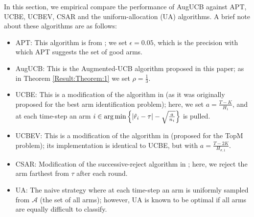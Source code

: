 
In this section, we empirical compare the  performance of AugUCB against APT, UCBE, UCBEV, CSAR and the uniform-allocation (UA) algorithms. A brief note about these algorithms are as follows:
\begin{itemize}
\item APT: This algorithm is from \cite{locatelli2016optimal}; we set $\epsilon=0.05$, which is the precision with which APT suggests the set of good arms.
\item AugUCB: This is the Augmented-UCB algorithm proposed in this paper; as in Theorem \ref{Result:Theorem:1} we set $\rho=\frac{1}{3}$.
\item UCBE: This is a modification of the algorithm in \cite{audibert2009exploration} (as it was originally proposed for the best arm identification problem); here, we set $a=\frac{T-K}{H_1}$, and at each time-step an arm $i\in\operatorname*{arg\,min}\left\lbrace |\hat{r}_{i} -\tau|-\sqrt{\frac{a}{n_{i}}} \right\rbrace$ is pulled.
\item UCBEV: This is a modification of the algorithm in \cite{gabillon2011multi} (proposed for the TopM problem); its implementation is identical to UCBE, but with $a = \frac{T-2K}{H_{\sigma,1}}$.
\item CSAR:  Modification of the successive-reject algorithm in \cite{chen2014combinatorial}; here, we reject the arm farthest from $\tau$ after each round. 
\item UA: The naive strategy where at each time-step an arm is uniformly sampled from $\mathcal{A}$ (the set of all arms); however, UA is known to be optimal if all arms are equally difficult to classify. 
\end{itemize}



